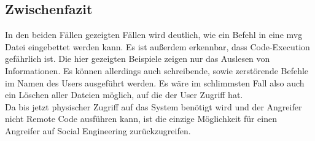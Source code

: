 
\subsection{Zwischenfazit}\label{subsec:zwischenfazit}

In den beiden Fällen gezeigten Fällen wird deutlich, wie ein Befehl in eine mvg Datei eingebettet werden kann.
Es ist außerdem erkennbar, dass Code-Execution gefährlich ist.
Die hier gezeigten Beispiele zeigen nur das Auslesen von Informationen.
Es können allerdings auch schreibende, sowie zerstörende Befehle im Namen des Users ausgeführt werden.
Es wäre im schlimmsten Fall also auch ein Löschen aller Dateien möglich, auf die der User Zugriff hat.
\\
Da bis jetzt physischer Zugriff auf das System benötigt wird und der Angreifer nicht Remote Code ausführen kann, ist die einzige Möglichkeit für einen Angreifer auf Social Engineering zurückzugreifen.